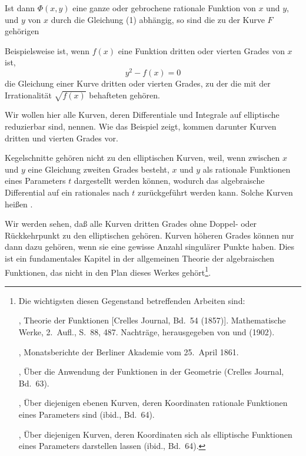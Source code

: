 
Ist dann $\Phi(x,y)$ eine ganze oder gebrochene rationale Funktion
von $x$ und $y$, und $y$ von $x$ durch die Gleichung (1) abhängig,
so sind
die zu der Kurve $F$ gehörigen 

Beispielsweise ist, wenn $f(x)$ eine Funktion dritten oder
vierten Grades von $x$ ist,
\[ y^2 - f(x) = 0 \]
die Gleichung einer Kurve dritten oder vierten Grades, zu der
die mit der Irrationalität $\sqrt{f(x)}$ behafteten  gehören.

Wir wollen hier alle Kurven, deren Differentiale und Integrale
auf elliptische reduzierbar sind, 
nennen. Wie das Beispiel zeigt, kommen darunter Kurven dritten
und vierten Grades vor.

Kegelschnitte gehören nicht zu den elliptischen Kurven, weil,
wenn zwischen $x$ und $y$ eine Gleichung zweiten Grades besteht,
$x$ und $y$ als rationale Funktionen eines Parameters $t$
dargestellt werden können, wodurch das algebraische Differential
auf ein rationales nach $t$ zurückgeführt werden kann. Solche
Kurven heißen .

Wir werden sehen, daß alle Kurven dritten Grades ohne Doppel-
oder Rückkehrpunkt zu den elliptischen gehören. Kurven höheren
Grades können nur dann dazu gehören, wenn sie eine gewisse
Anzahl singulärer Punkte haben. Dies ist ein fundamentales
Kapitel in der allgemeinen Theorie der algebraischen Funktionen,
das nicht in den Plan dieses Werkes gehört\footnote{Die
wichtigsten diesen Gegenstand betreffenden Arbeiten sind:

, Theorie der  Funktionen [Crelles
Journal, Bd.\ 54 (1857)]. Mathematische Werke, 2.\ Aufl., S.\ 88,
487. Nachträge, herausgegeben von  und
 (1902).

, Monatsberichte der Berliner Akademie vom
25.\ April 1861.

, Über die Anwendung der  Funktionen
in der Geometrie (Crelles Journal, Bd.\ 63).

, Über diejenigen ebenen Kurven, deren
Koordinaten rationale Funktionen eines Parameters sind (ibid.,
Bd.\ 64).

, Über diejenigen Kurven, deren Koordinaten
sich als elliptische Funktionen eines Parameters darstellen
lassen (ibid., Bd.\ 64).}.
